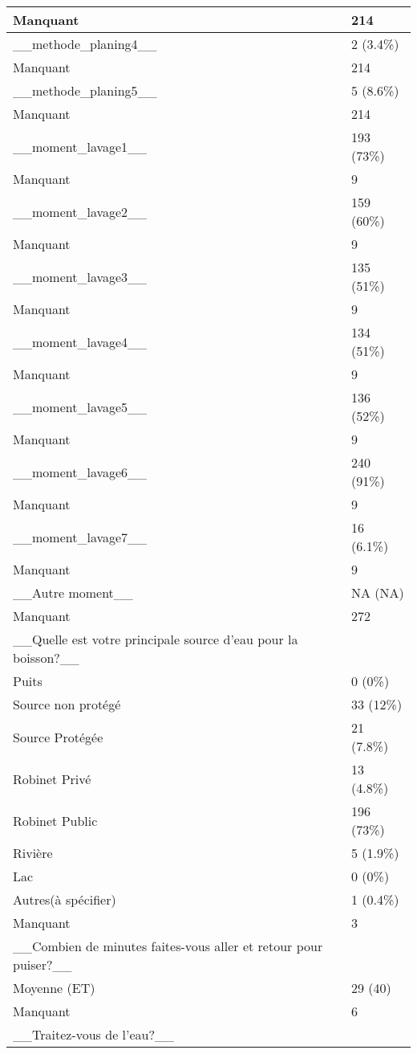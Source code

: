 \documentclass[
]{book}
\begin{document}
\begin{tabular}{l|l}
\hline
Manquant & 214\\
\hline
\_\_methode\_planing4\_\_ & 2 (3.4\%)\\
\hline
Manquant & 214\\
\hline
\_\_methode\_planing5\_\_ & 5 (8.6\%)\\
\hline
Manquant & 214\\
\hline
\_\_moment\_lavage1\_\_ & 193 (73\%)\\
\hline
Manquant & 9\\
\hline
\_\_moment\_lavage2\_\_ & 159 (60\%)\\
\hline
Manquant & 9\\
\hline
\_\_moment\_lavage3\_\_ & 135 (51\%)\\
\hline
Manquant & 9\\
\hline
\_\_moment\_lavage4\_\_ & 134 (51\%)\\
\hline
Manquant & 9\\
\hline
\_\_moment\_lavage5\_\_ & 136 (52\%)\\
\hline
Manquant & 9\\
\hline
\_\_moment\_lavage6\_\_ & 240 (91\%)\\
\hline
Manquant & 9\\
\hline
\_\_moment\_lavage7\_\_ & 16 (6.1\%)\\
\hline
Manquant & 9\\
\hline
\_\_Autre moment\_\_ & NA  (NA)\\
\hline
Manquant & 272\\
\hline
\_\_Quelle est votre principale source d'eau pour la boisson?\_\_ & \\
\hline
Puits & 0 (0\%)\\
\hline
Source non  protégé & 33 (12\%)\\
\hline
Source Protégée & 21 (7.8\%)\\
\hline
Robinet Privé & 13 (4.8\%)\\
\hline
Robinet Public & 196 (73\%)\\
\hline
Rivière & 5 (1.9\%)\\
\hline
Lac & 0 (0\%)\\
\hline
Autres(à spécifier) & 1 (0.4\%)\\
\hline
Manquant & 3\\
\hline
\_\_Combien de minutes faites-vous aller et retour pour puiser?\_\_ & \\
\hline
Moyenne  (ET) & 29  (40)\\
\hline
Manquant & 6\\
\hline
\_\_Traitez-vous de l'eau?\_\_ & \\

\end{tabular}
\end{document}

